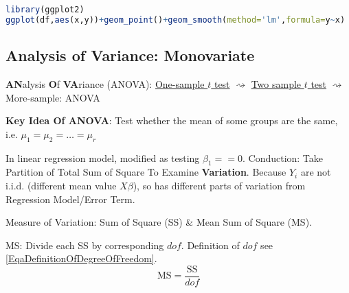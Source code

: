 \begin{rcode}
\begin{lstlisting}[language=R]
library(ggplot2)
ggplot(df,aes(x,y))+geom_point()+geom_smooth(method='lm',formula=y~x)
\end{lstlisting}
\end{rcode}


\subsection{Analysis of Variance: Monovariate}
    \textbf{AN}alysis \textbf{O}f \textbf{VA}riance (ANOVA): \hyperlink{OneSampletTest}{One-sample $ t $ test} $\rightsquigarrow $ \hyperlink{TwoSampletTest}{Two sample $ t $ test} $\rightsquigarrow $ More-sample: ANOVA

\begin{point}
    \textbf{Key Idea Of ANOVA}: Test whether the mean of some groups are the same, i.e. $ \mu_1=\mu _2=\ldots=\mu _r $ 
\end{point}



    In linear regression model, modified as testing $ \beta _1==0 $. Conduction: Take Partition of Total Sum of Square To Examine \textbf{Variation}. Because $ Y_i $ are not i.i.d. (different mean value $ X\beta  $), so has different parts of variation from Regression Model/Error Term.




    Measure of Variation: Sum of Square (SS) \& Mean Sum of Square (MS).

    MS: Divide each SS by corresponding $ dof $. Definition of $ dof $ see \autoref{EqaDefinitionOfDegreeOfFreedom}.
    \begin{equation}
        \mathrm{MS}=\dfrac{\mathrm{SS}}{dof} 
    \end{equation}

